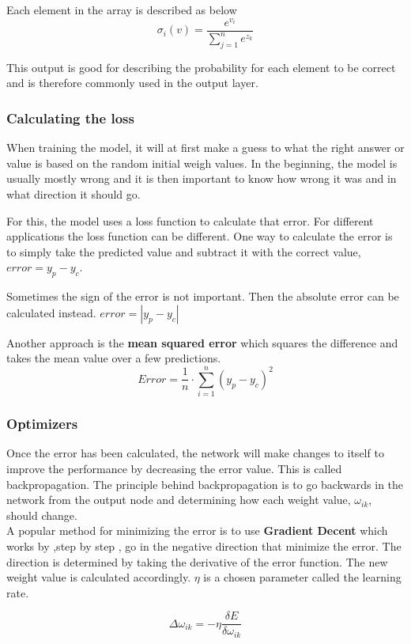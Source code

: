Each element in the array is described as below
\[ \sigma_i(v) = \frac{e^{v_i}}{\displaystyle\sum_{j=1}^{n} e^{z_k}} \]

This output is good for describing the probability for each element to be correct and is therefore commonly used
in the output layer.

\subsubsection{Calculating the loss}
When training the model, it will at first make a guess to what the right answer or value is based on the random initial weigh values. In the beginning, the model is usually mostly wrong and it is then important to know how wrong it was and in what direction it should go.

For this, the model uses a loss function to calculate that error. For different applications the loss function can be different.
One way to calculate the error is to simply take the predicted value and subtract it with the correct value, $ error = y_p - y_c $.

Sometimes the sign of the error is not important. Then the absolute error can be calculated instead. $error = |y_p - y_c| $

Another approach is the \textbf{mean squared error} which squares the difference and takes the mean value over a few predictions.
\[Error = \frac{1}{n} \cdot \displaystyle\sum_{i=1}^{n} (y_p - y_c)^{2} \]


\subsubsection{Optimizers}
Once the error has been calculated, the network will make changes to itself to improve the performance by decreasing the error value. This is called backpropagation.
The principle behind backpropagation is to go backwards in the network from the output node and determining how each weight value, $ \omega_{ik} $, should change.\\

A popular method for minimizing the error is to use \textbf{Gradient Decent} which works by ,step by step , go in the negative direction that minimize the error.
The direction is determined by taking the derivative of the error function.
The new weight value is calculated accordingly. $\eta$ is a chosen parameter called the learning rate.

\[ \Delta \omega_{ik} = -\eta \frac{\delta E}{\delta \omega_{ik}} \]

